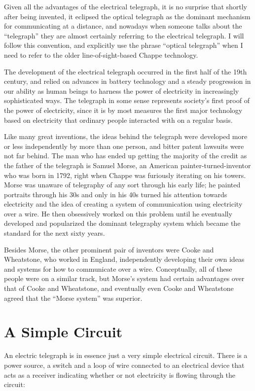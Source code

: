 \documentclass{book}
\begin{document}
Given all the advantages of the electrical telegraph, it is no surprise that shortly after being invented, it eclipsed the optical telegraph as the dominant mechanism for communicating at a distance, and nowadays when someone talks about the ``telegraph'' they are almost certainly referring to the electrical telegraph. I will follow this convention, and explicitly use the phrase ``optical telegraph'' when I need to refer to the older line-of-sight-based Chappe technology.

The development of the electrical telegraph occurred in the first half of the 19th century, and relied on advances in battery technology and a steady progression in our ability as human beings to harness the power of electricity in increasingly sophisticated ways. The telegraph in some sense represents society's first proof of the power of electricity, since it is by most measures the first major technology based on electricity that ordinary people interacted with on a regular basis.

Like many great inventions, the ideas behind the telegraph were developed more or less independently by more than one person, and bitter patent lawsuits were not far behind. The man who has ended up getting the majority of the credit as the father of the telegraph is Samuel Morse, an American painter-turned-inventor who was born in 1792, right when Chappe was furiously iterating on his towers. Morse was unaware of telegraphy of any sort through his early life; he painted portraits through his 30s and only in his 40s turned his attention towards electricity and the idea of creating a system of communication using electricity over a wire. He then obsessively worked on this problem until he eventually developed and popularized the dominant telegraphy system which became the standard for the next sixty years.

Besides Morse, the other prominent pair of inventors were Cooke and Wheatstone, who worked in England, independently developing their own ideas and systems for how to communicate over a wire. Conceptually, all of these people were on a similar track, but Morse's system had certain advantages over that of Cooke and Wheatstone, and eventually even Cooke and Wheatstone agreed that the ``Morse system'' was superior.

\section{A Simple Circuit}

An electric telegraph is in essence just a very simple electrical circuit. There is a power source, a switch and a loop of wire connected to an electrical device that acts as a receiver indicating whether or not electricity is flowing through the circuit:
\end{document}
